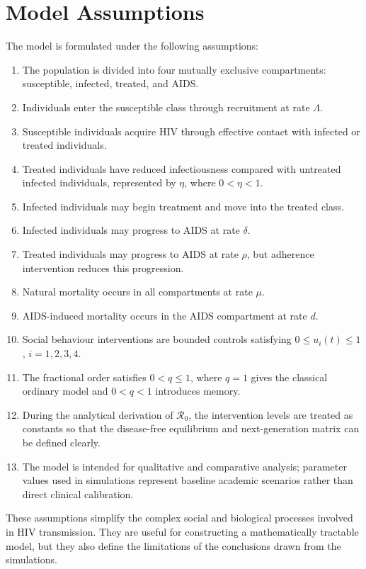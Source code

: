\documentclass[12pt,a4paper,oneside]{report}
\newcommand{\Rzero}{\mathcal{R}_0}
\begin{document}
\section{Model Assumptions}
The model is formulated under the following assumptions:
\begin{enumerate}
  \item The population is divided into four mutually exclusive compartments: susceptible, infected, treated, and AIDS.
  \item Individuals enter the susceptible class through recruitment at rate $\Lambda$.
  \item Susceptible individuals acquire HIV through effective contact with infected or treated individuals.
  \item Treated individuals have reduced infectiousness compared with untreated infected individuals, represented by $\eta$, where $0<\eta<1$.
  \item Infected individuals may begin treatment and move into the treated class.
  \item Infected individuals may progress to AIDS at rate $\delta$.
  \item Treated individuals may progress to AIDS at rate $\rho$, but adherence intervention reduces this progression.
  \item Natural mortality occurs in all compartments at rate $\mu$.
  \item AIDS-induced mortality occurs in the AIDS compartment at rate $d$.
  \item Social behaviour interventions are bounded controls satisfying $0\leq u_i(t)\leq1$, $i=1,2,3,4$.
  \item The fractional order satisfies $0<q\leq1$, where $q=1$ gives the classical ordinary model and $0<q<1$ introduces memory.
  \item During the analytical derivation of $\Rzero$, the intervention levels are treated as constants so that the disease-free equilibrium and next-generation matrix can be defined clearly.
  \item The model is intended for qualitative and comparative analysis; parameter values used in simulations represent baseline academic scenarios rather than direct clinical calibration.
\end{enumerate}

These assumptions simplify the complex social and biological processes involved in HIV transmission. They are useful for constructing a mathematically tractable model, but they also define the limitations of the conclusions drawn from the simulations.
\end{document}
